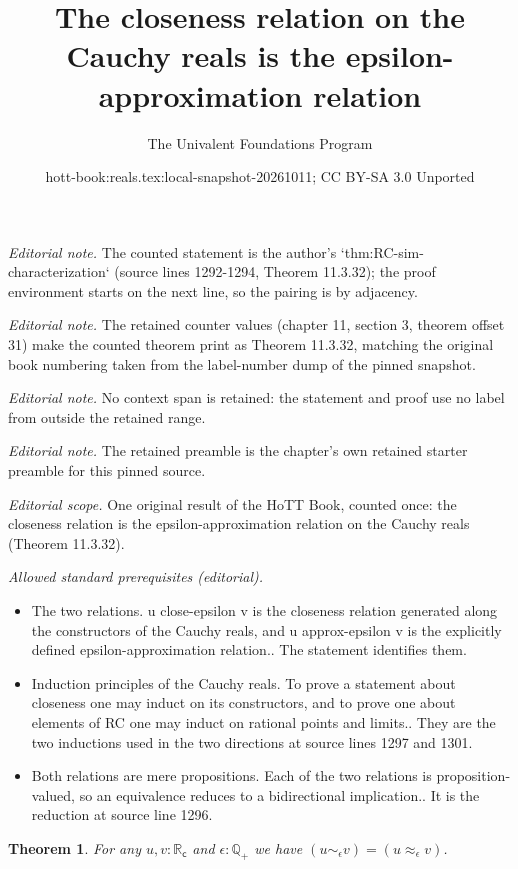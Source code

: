 \documentclass[10pt,a4paper]{article}
\title{The closeness relation on the Cauchy reals is the epsilon-approximation relation}
\author{The Univalent Foundations Program}
\date{hott-book:reals.tex:local-snapshot-20261011; CC BY-SA 3.0 Unported}
\newcounter{chapter}
\newcommand{\Q}{\ensuremath{\mathbb{Q}}\xspace}
\newcommand{\RC}{\ensuremath{\mathbb{R}_\mathsf{c}}\xspace} %
\newcommand{\close}[1]{\sim_{#1}} %
\newcommand{\Qp}{\Q_{+}}
\newtheorem{thm}{Theorem}[section]
\theoremstyle{definition}
\theoremstyle{remark}
\numberwithin{equation}{section}
\begin{document}
\maketitle
\setcounter{chapter}{11}
\setcounter{section}{3}
\setcounter{thm}{31}
\noindent\textit{Editorial note.} The counted statement is the author's `thm:RC-sim-characterization` (source lines 1292-1294, Theorem 11.3.32); the proof environment starts on the next line, so the pairing is by adjacency.\par\medskip
\noindent\textit{Editorial note.} The retained counter values (chapter 11, section 3, theorem offset 31) make the counted theorem print as Theorem 11.3.32, matching the original book numbering taken from the label-number dump of the pinned snapshot.\par\medskip
\noindent\textit{Editorial note.} No context span is retained: the statement and proof use no label from outside the retained range.\par\medskip
\noindent\textit{Editorial note.} The retained preamble is the chapter's own retained starter preamble for this pinned source.\par\medskip
\noindent\textit{Editorial scope.} One original result of the HoTT Book, counted once: the closeness relation is the epsilon-approximation relation on the Cauchy reals (Theorem 11.3.32).\par\medskip
\noindent\textit{Allowed standard prerequisites (editorial).}\begin{itemize}
\item The two relations. u close-epsilon v is the closeness relation generated along the constructors of the Cauchy reals, and u approx-epsilon v is the explicitly defined epsilon-approximation relation.. The statement identifies them.
\item Induction principles of the Cauchy reals. To prove a statement about closeness one may induct on its constructors, and to prove one about elements of RC one may induct on rational points and limits.. They are the two inductions used in the two directions at source lines 1297 and 1301.
\item Both relations are mere propositions. Each of the two relations is proposition-valued, so an equivalence reduces to a bidirectional implication.. It is the reduction at source line 1296.
\end{itemize}\medskip
\begin{thm}\label{thm:RC-sim-characterization}
  For any $u,v:\RC$ and $\epsilon:\Qp$ we have $(u\close\epsilon v) = (u\approx_\epsilon v)$.
\end{thm}
\end{document}
